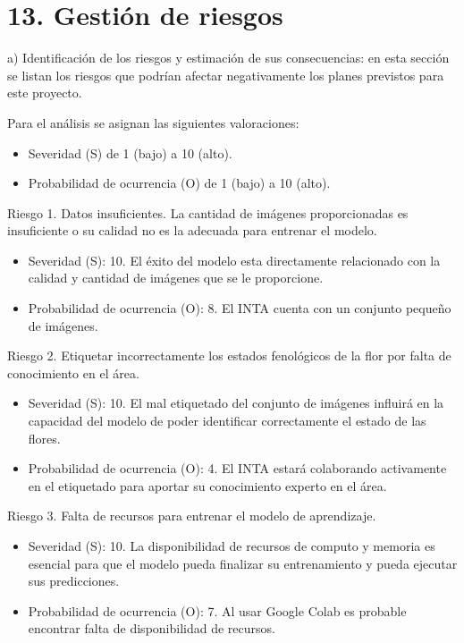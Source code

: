\documentclass[
11pt, %
]{charter}
\begin{document}
\section{13. Gestión de riesgos}
\label{sec:riesgos}

a) Identificación de los riesgos y estimación de sus consecuencias: en esta sección se listan los riesgos que podrían afectar negativamente los planes previstos para este proyecto.

Para el análisis se asignan las siguientes valoraciones:

\begin{itemize}
\item Severidad (S) de 1 (bajo) a 10 (alto).
\item Probabilidad de ocurrencia (O) de 1 (bajo) a 10 (alto).
\end{itemize}

Riesgo 1. Datos insuficientes. La cantidad de imágenes proporcionadas es insuficiente o su calidad no es la adecuada para entrenar el modelo.

\begin{itemize}
\item Severidad (S): 10. El éxito del modelo esta directamente relacionado con la calidad y cantidad de imágenes que se le proporcione. 

\item Probabilidad de ocurrencia (O): 8. El INTA cuenta con un conjunto pequeño de imágenes. 
\end{itemize}

Riesgo 2. Etiquetar incorrectamente los estados fenológicos de la flor por falta de conocimiento en el área.

\begin{itemize}
\item Severidad (S): 10. El mal etiquetado del conjunto de imágenes influirá en la capacidad del modelo de poder identificar correctamente el estado de las flores. 

\item Probabilidad de ocurrencia (O): 4. El INTA estará colaborando activamente en el etiquetado para aportar su conocimiento experto en el área. 
\end{itemize}

Riesgo 3. Falta de recursos para entrenar el modelo de aprendizaje.

\begin{itemize}
\item Severidad (S): 10. La disponibilidad de recursos de computo y memoria es esencial para que el modelo pueda finalizar su entrenamiento y pueda ejecutar sus predicciones. 

\item Probabilidad de ocurrencia (O): 7. Al usar Google Colab es probable encontrar falta de disponibilidad de recursos. 
\end{itemize}
\end{document}
